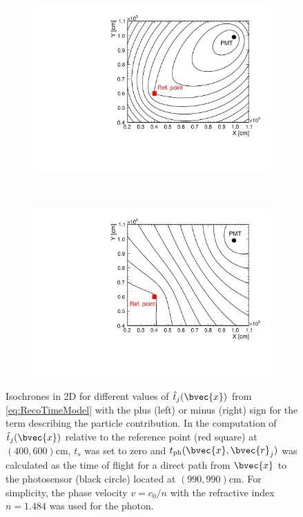 \begin{figure}[b!t]
  \centering
  \begin{subfigure}[t]{0.48\textwidth}     
    \includegraphics[trim=0.1cm 0.1cm 0.5cm 0.1cm,clip=true,width=\textwidth]
      {recon/DropShape_forward.pdf}
  \end{subfigure}
  ~
  \begin{subfigure}[t]{0.48\textwidth}
    \includegraphics[trim=0.1cm 0.1cm 0.5cm 0.1cm,clip=true,width=\textwidth]
      {recon/DropShape_backward.pdf}
  \end{subfigure}
  \caption{
Isochrones in 2D for different values of $\hat{t}_j(\bvec{x})$ from 
\eqref{eq:RecoTimeModel} with the plus (left) or minus (right) sign for the term describing the 
particle contribution. In the computation of $\hat{t}_j(\bvec{x})$ relative to the reference point 
(red square) at $(400, 600)$\unit{cm}, $t_s$ was set to zero and 
$t_{\mathrm{ph}}(\bvec{x},\bvec{r}_j)$ was calculated as the time of flight for a direct path from 
$\bvec{x}$ to the photosensor (black circle) located at $(990, 990)$\unit{cm}. For simplicity, the 
phase velocity $v=c_0 / n$ with the refractive index $n = 1.484$ was used for the photon.}
  \label{fig:DropShapes}
\end{figure}
  

